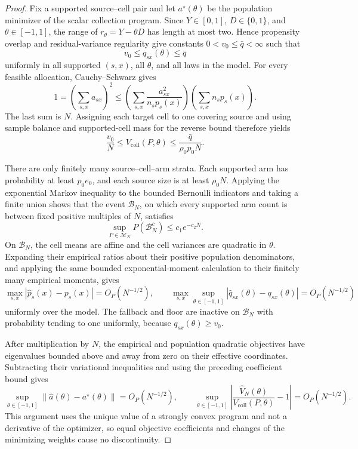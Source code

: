 \documentclass{article}
\begin{document}
\begin{proof}
Fix a supported source--cell pair and let \(a^{\star}(\theta)\) be the population minimizer of the scalar collection program. Since \(Y\in[0,1]\), \(D\in\{0,1\}\), and \(\theta\in[-1,1]\), the range of \(r_\theta=Y-\theta D\) has length at most two. Hence propensity overlap and residual-variance regularity give constants \(0<v_0\le\bar q<\infty\) such that
\[
 v_0\le q_{sx}(\theta)\le\bar q
\]
uniformly in all supported \((s,x)\), all \(\theta\), and all laws in the model. For every feasible allocation, Cauchy--Schwarz gives
\[
 1=\left(\sum_{s,x}a_{sx}\right)^2
 \le
 \left(\sum_{s,x}\frac{a_{sx}^2}{n_sp_s(x)}\right)
 \left(\sum_{s,x}n_sp_s(x)\right).
\]
The last sum is \(N\). Assigning each target cell to one covering source and using sample balance and supported-cell mass for the reverse bound therefore yields
\[
 \frac{v_0}{N}\le V_{\mathrm{coll}}(P,\theta)
 \le\frac{\bar q}{\rho_0p_0N}.
\]

There are only finitely many source--cell--arm strata. Each supported arm has probability at least \(p_0e_0\), and each source size is at least \(\rho_0N\). Applying the exponential Markov inequality to the bounded Bernoulli indicators and taking a finite union shows that the event \(\mathcal B_N\), on which every supported arm count is between fixed positive multiples of \(N\), satisfies
\[
 \sup_{P\in\mathcal M_N}P(\mathcal B_N^c)\le c_1e^{-c_2N}.
\]
On \(\mathcal B_N\), the cell means are affine and the cell variances are quadratic in \(\theta\). Expanding their empirical ratios about their positive population denominators, and applying the same bounded exponential-moment calculation to their finitely many empirical moments, gives
\[
 \max_{s,x}|\widehat p_s(x)-p_s(x)|=O_P(N^{-1/2}),
 \qquad
 \max_{s,x}\sup_{\theta\in[-1,1]}
 |\widehat q_{sx}(\theta)-q_{sx}(\theta)|=O_P(N^{-1/2})
\]
uniformly over the model. The fallback and floor are inactive on \(\mathcal B_N\) with probability tending to one uniformly, because \(q_{sx}(\theta)\ge v_0\).

After multiplication by \(N\), the empirical and population quadratic objectives have eigenvalues bounded above and away from zero on their effective coordinates. Subtracting their variational inequalities and using the preceding coefficient bound gives
\[
 \sup_{\theta\in[-1,1]}
 \|\widehat a(\theta)-a^{\star}(\theta)\|=O_P(N^{-1/2}),
 \qquad
 \sup_{\theta\in[-1,1]}
 \left|\frac{\widehat V_N(\theta)}
 {V_{\mathrm{coll}}(P,\theta)}-1\right|=O_P(N^{-1/2}).
\]
This argument uses the unique value of a strongly convex program and not a derivative of the optimizer, so equal objective coefficients and changes of the minimizing weights cause no discontinuity.


\end{proof}
\end{document}
